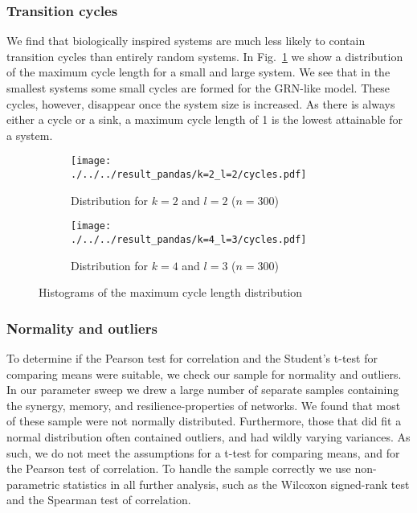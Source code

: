 \documentclass[../main.tex]{subfiles}
\begin{document}
\subsubsection{Transition cycles}

We find that biologically inspired systems are much less likely to contain transition cycles than entirely random systems.
In Fig.~\ref{fig:cycles} we show a distribution of the maximum cycle length for a small and large system.
We see that in the smallest systems some small cycles are formed for the GRN-like model.
These cycles, however, disappear once the system size is increased.
As there is always either a cycle or a sink, a maximum cycle length of 1 is the lowest attainable for a system.

\begin{figure}[H]
    \centering
    \begin{subfigure}[b]{0.4\textwidth}
        \texttt{[image: ./../../result\_pandas/k=2\_l=2/cycles.pdf]}
        \caption{Distribution for $k=2$ and $l=2$ ($n=300$)}
    \end{subfigure}
    \begin{subfigure}[b]{0.4\textwidth}
        \texttt{[image: ./../../result\_pandas/k=4\_l=3/cycles.pdf]}
        \caption{Distribution for $k=4$ and $l=3$ ($n=300$)}
    \end{subfigure}
    \caption{Histograms of the maximum cycle length distribution}
    \label{fig:cycles}
\end{figure}


\subsubsection{Normality and outliers}

To determine if the Pearson test for correlation and the Student's t-test for comparing means were suitable, we check our sample for normality and outliers.
In our parameter sweep we drew a large number of separate samples containing the synergy, memory, and resilience-properties of networks.
We found that most of these sample were not normally distributed.
Furthermore, those that did fit a normal distribution often contained outliers, and had wildly varying variances.
As such, we do not meet the assumptions for a t-test for comparing means, and for the Pearson test of correlation.
To handle the sample correctly we use non-parametric statistics in all further analysis, such as the Wilcoxon signed-rank test and the Spearman test of correlation. %
\end{document}
